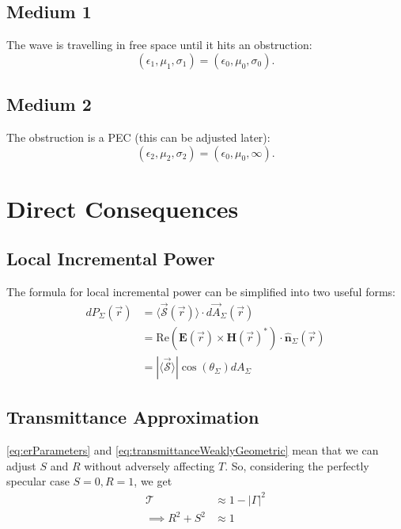 \documentclass{article}
\begin{document}
\subsection{Medium 1}
The wave is travelling in free space until it hits an obstruction:
\begin{equation}
   (\epsilon_1, \mu_1, \sigma_1) = (\epsilon_0, \mu_0, \sigma_0).
   \label{eq:medium1}
\end{equation}
\subsection{Medium 2}
The obstruction is a PEC (this can be adjusted later):
\begin{equation}
   (\epsilon_2, \mu_2, \sigma_2) = (\epsilon_0, \mu_0, \infty).
   \label{eq:medium2}
\end{equation}

\setcounter{section}{3}   %
\setcounter{subsection}{0}
\setcounter{equation}{0}  %
\section{Direct Consequences}
\subsection{Local Incremental Power}
The formula for local incremental power can be simplified into two useful forms:
\begin{subequations}
\begin{align}
   dP_{\Sigma}(\vec{r}) &= \langle \vec{{\mathcal{S} }}(\vec{r}) \rangle \cdot d
      \vec{A}_{\Sigma} ( \vec{r} ) \nonumber \\
   &= \text{Re}( \mathbf{E}(\vec{r}) \times \mathbf{H}(\vec{r})^{*} ) \cdot
      \hat{\mathbf{n}}_{\Sigma}(\vec{r}) \\
   &= | \langle \vec{\mathcal{S}} \rangle | \cos( \theta_{\Sigma} )
      dA_{\Sigma} 
      \label{eq:localIncrementalPowerPoynting}
\end{align}
\end{subequations}
\subsection{Transmittance Approximation}
\eqref{eq:erParameters} and \eqref{eq:transmittanceWeaklyGeometric} mean that we can
adjust $S$ and $R$ without adversely affecting $T$. So, considering the perfectly
specular case $S=0, R=1$, we get
\begin{align}
   \mathcal{T} &\approx 1 - | \Gamma |^2 \nonumber \\
   \implies R^2 + S^2 & \approx 1 
   \label{eq:RApprox}
\end{align}
\end{document}
